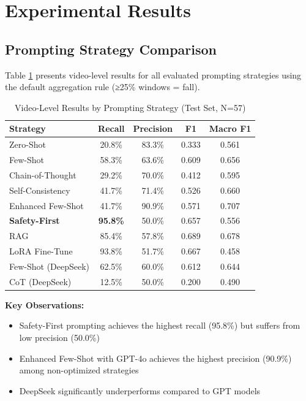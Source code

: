 \documentclass[conference]{IEEEtran}
\begin{document}
\section{Experimental Results}

\subsection{Prompting Strategy Comparison}

Table \ref{tab:main_results} presents video-level results for all evaluated prompting strategies using the default aggregation rule (≥25\% windows = fall).

\begin{table}[h]
\centering
\caption{Video-Level Results by Prompting Strategy (Test Set, N=57)}
\label{tab:main_results}
\begin{tabular}{lcccc}
\toprule
\textbf{Strategy} & \textbf{Recall} & \textbf{Precision} & \textbf{F1} & \textbf{Macro F1} \\
\midrule
Zero-Shot & 20.8\% & 83.3\% & 0.333 & 0.561 \\
Few-Shot & 58.3\% & 63.6\% & 0.609 & 0.656 \\
Chain-of-Thought & 29.2\% & 70.0\% & 0.412 & 0.595 \\
Self-Consistency & 41.7\% & 71.4\% & 0.526 & 0.660 \\
Enhanced Few-Shot & 41.7\% & 90.9\% & 0.571 & 0.707 \\
\textbf{Safety-First} & \textbf{95.8\%} & 50.0\% & 0.657 & 0.556 \\
RAG & 85.4\% & 57.8\% & 0.689 & 0.678 \\
LoRA Fine-Tune & 93.8\% & 51.7\% & 0.667 & 0.458 \\
Few-Shot (DeepSeek) & 62.5\% & 60.0\% & 0.612 & 0.644 \\
CoT (DeepSeek) & 12.5\% & 50.0\% & 0.200 & 0.490 \\
\bottomrule
\end{tabular}
\end{table}

\textbf{Key Observations:}
\begin{itemize}
    \item Safety-First prompting achieves the highest recall (95.8\%) but suffers from low precision (50.0\%)
    \item Enhanced Few-Shot with GPT-4o achieves the highest precision (90.9\%) among non-optimized strategies
    \item DeepSeek significantly underperforms compared to GPT models
\end{itemize}
\end{document}
